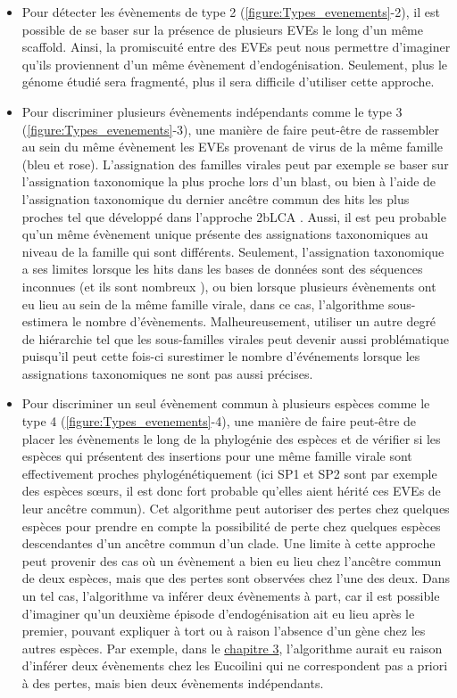 \begin{itemize}

    \item Pour détecter les évènements de type 2 (\figurename{\ref{figure:Types_evenements}}-2), il est possible de se baser sur la présence de plusieurs EVEs le long d'un même scaffold. Ainsi, la promiscuité entre des EVEs peut nous permettre d'imaginer qu'ils proviennent d'un même évènement d'endogénisation. Seulement, plus le génome étudié sera fragmenté, plus il sera difficile d'utiliser cette approche. 
    
    \item Pour discriminer plusieurs évènements indépendants comme le type 3 (\figurename{\ref{figure:Types_evenements}}-3), une manière de faire peut-être de rassembler au sein du même évènement les EVEs provenant de virus de la même famille (bleu et rose). L'assignation des familles virales peut par exemple se baser sur l'assignation taxonomique la plus proche lors d'un blast, ou bien à l'aide de l'assignation taxonomique du dernier ancêtre commun des hits les plus proches tel que développé dans l'approche 2bLCA \cite{ingamp_exploring_2013}. Aussi, il est peu probable qu'un même évènement unique présente des assignations taxonomiques au niveau de la famille qui sont différents. Seulement, l'assignation taxonomique a ses limites lorsque les hits dans les bases de données sont des séquences inconnues (et ils sont nombreux \citep{mirdita_fast_2021}), ou bien lorsque plusieurs évènements ont eu lieu au sein de la même famille virale, dans ce cas, l'algorithme sous-estimera le nombre d'évènements. Malheureusement, utiliser un autre degré de hiérarchie tel que les sous-familles virales peut devenir aussi problématique puisqu'il peut cette fois-ci surestimer le nombre d'événements lorsque les assignations taxonomiques ne sont pas aussi précises. 
    
    \item Pour discriminer un seul évènement commun à plusieurs espèces comme le type 4 (\figurename{\ref{figure:Types_evenements}}-4), une manière de faire peut-être de placer les évènements le long de la phylogénie des espèces et de vérifier si les espèces qui présentent des insertions pour une même famille virale sont effectivement proches phylogénétiquement (ici SP1 et SP2 sont par exemple des espèces sœurs, il est donc fort probable qu'elles aient hérité ces EVEs de leur ancêtre commun). Cet algorithme peut autoriser des pertes chez quelques espèces pour prendre en compte la possibilité de perte chez quelques espèces descendantes d'un ancêtre commun d'un clade. Une limite à cette approche peut provenir des cas où un évènement a bien eu lieu chez l'ancêtre commun de deux espèces, mais que des pertes sont observées chez l'une des deux. Dans un tel cas, l'algorithme va inférer deux évènements à part, car il est possible d'imaginer qu'un deuxième épisode d'endogénisation ait eu lieu après le premier, pouvant expliquer à tort ou à raison l'absence d'un gène chez les autres espèces. Par exemple, dans le \hyperref[sec:chap3]{chapitre 3}, l'algorithme aurait eu raison d'inférer deux évènements chez les Eucoilini qui ne correspondent pas a priori à des pertes, mais bien deux évènements indépendants. 
  

\end{itemize}
